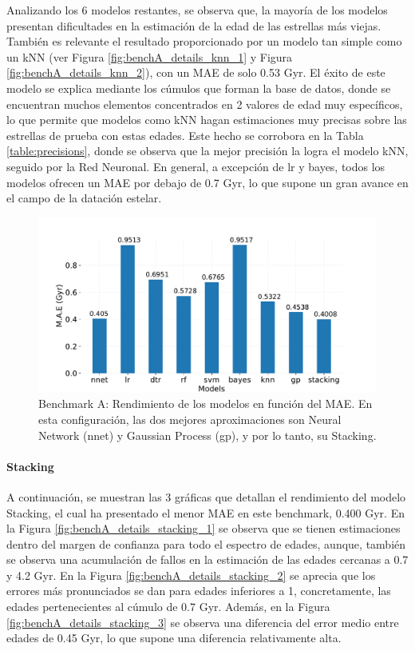Analizando los 6 modelos restantes, se observa que, la mayoría de los modelos presentan dificultades en la estimación de la edad de las estrellas más viejas. También es relevante el resultado proporcionado por un modelo tan simple como un kNN (ver Figura \ref{fig:benchA_details_knn_1} y Figura \ref{fig:benchA_details_knn_2}), con un MAE de solo 0.53 Gyr. El éxito de este modelo se explica mediante los cúmulos que forman la base de datos, donde se encuentran muchos elementos concentrados en 2 valores de edad muy específicos, lo que permite que modelos como kNN hagan estimaciones muy precisas sobre las estrellas de prueba con estas edades. Este hecho se corrobora en la Tabla \ref{table:precisions}, donde se observa que la mejor precisión la logra el modelo kNN, seguido por la Red Neuronal. En general, a excepción de lr y bayes, todos los modelos ofrecen un MAE por debajo de 0.7 Gyr, lo que supone un gran avance en el campo de la datación estelar.

\begin{figure}[H]
\begin{center}
 \includegraphics[width=0.8\linewidth]{Figuras/Experimentos/B_A_models.pdf}
\end{center}
\caption{Benchmark A: Rendimiento de los modelos en función del MAE. En esta configuración, las dos mejores aproximaciones son Neural Network (nnet) y Gaussian Process (gp), y por lo tanto, su Stacking.}
 \label{fig:benchA_models}
\end{figure}

\paragraph{Stacking} 
A continuación, se muestran las 3 gráficas que detallan el rendimiento del modelo Stacking, el cual ha presentado el menor MAE en este benchmark, 0.400 Gyr. En la Figura \ref{fig:benchA_details_stacking_1} se observa que se tienen estimaciones dentro del margen de confianza para todo el espectro de edades, aunque, también se observa una acumulación de fallos en la estimación de las edades cercanas a 0.7 y 4.2 Gyr. En la Figura \ref{fig:benchA_details_stacking_2} se aprecia que los errores más pronunciados se dan para edades inferiores a 1, concretamente, las edades pertenecientes al cúmulo de 0.7 Gyr. Además, en la Figura \ref{fig:benchA_details_stacking_3} se observa una diferencia del error medio entre edades de 0.45 Gyr, lo que supone una diferencia relativamente alta.

